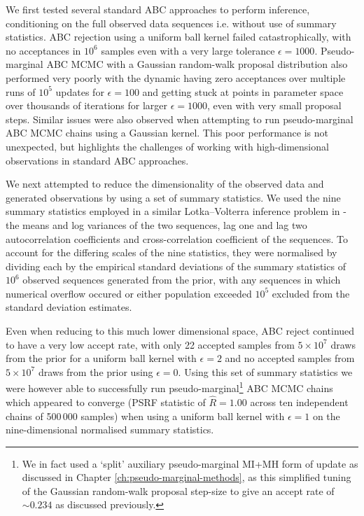 We first tested several standard \ac{ABC} approaches to perform inference, conditioning on the full observed data sequences i.e. without use of summary statistics. \ac{ABC} rejection using a uniform ball kernel failed catastrophically, with no acceptances in $10^6$ samples even with a very large tolerance $\epsilon = 1000$. Pseudo-marginal \ac{ABC} \ac{MCMC} with a Gaussian random-walk proposal distribution also performed very poorly with the dynamic having zero acceptances over multiple runs of $10^5$ updates for $\epsilon=100$ and getting stuck at points in parameter space over thousands of iterations for larger $\epsilon=1000$, even with very small proposal steps. Similar issues were also observed when attempting to run pseudo-marginal \ac{ABC} \ac{MCMC} chains using a Gaussian kernel. This poor performance is not unexpected, but highlights the challenges of working with high-dimensional observations in standard \ac{ABC} approaches.

We next attempted to reduce the dimensionality of the observed data and generated observations by using a set of summary statistics. We used the nine summary statistics employed in a similar Lotka--Volterra inference problem in \citep{papamakarios2016epsilon} - the means and log variances of the two sequences, lag one and lag two autocorrelation coefficients and cross-correlation coefficient of the sequences. To account for the differing scales of the nine statistics, they were normalised by dividing each by the empirical standard deviations of the summary statistics of $10^6$ observed sequences generated from the prior, with any sequences in which numerical overflow occured or either population exceeded $10^5$ excluded from the standard deviation estimates. 

Even when reducing to this much lower dimensional space, \ac{ABC} reject continued to have a very low accept rate, with only 22 accepted samples from $5 \times 10^7$ draws from the prior for a uniform ball kernel with $\epsilon = 2$ and no accepted samples from $5 \times 10^7$ draws from the prior using $\epsilon = 0$. Using this set of summary statistics we were however able to successfully run pseudo-marginal\footnote{We in fact used a `split' auxiliary pseudo-marginal \ac{MI}+\ac{MH} form of update as discussed in Chapter \ref{ch:pseudo-marginal-methods}, as this simplified tuning of the Gaussian random-walk proposal step-size to give an accept rate of $\sim 0.234$ as discussed previously.} \ac{ABC} \ac{MCMC} chains which appeared to converge (\ac{PSRF} statistic of $\hat{R}=1.00$ across ten independent chains of 500\,000 samples) when using a uniform ball kernel with $\epsilon = 1$ on the nine-dimensional normalised summary statistics. 

